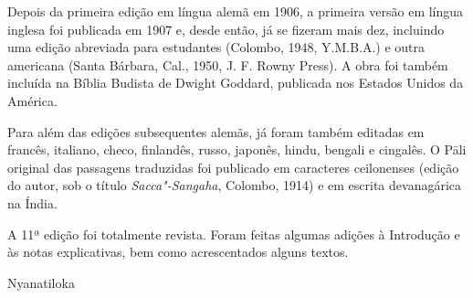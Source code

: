 Depois da primeira edição em língua alemã em 1906, a primeira versão em língua
inglesa foi publicada em 1907 e, desde então, já se fizeram mais dez, incluindo
uma edição abreviada para estudantes (Colombo, 1948, Y.M.B.A.) e outra americana
(Santa Bárbara, Cal., 1950, J. F. Rowny Press). A obra foi também incluída na
Bíblia Budista de Dwight Goddard, publicada nos Estados Unidos da América.

Para além das edições subsequentes alemãs, já foram também editadas em francês,
italiano, checo, finlandês, russo, japonês, hindu, bengali e cingalês. O Pāli
original das passagens traduzidas foi publicado em caracteres ceilonenses
(edição do autor, sob o título \emph{Sacca"-Sangaha}, Colombo, 1914) e em escrita
devanagárica na Índia.

A 11ª edição foi totalmente revista. Foram feitas algumas adições à Introdução e
às notas explicativas, bem como acrescentados alguns textos.

\bigskip

{\raggedleft
  Nyanatiloka
\par}
